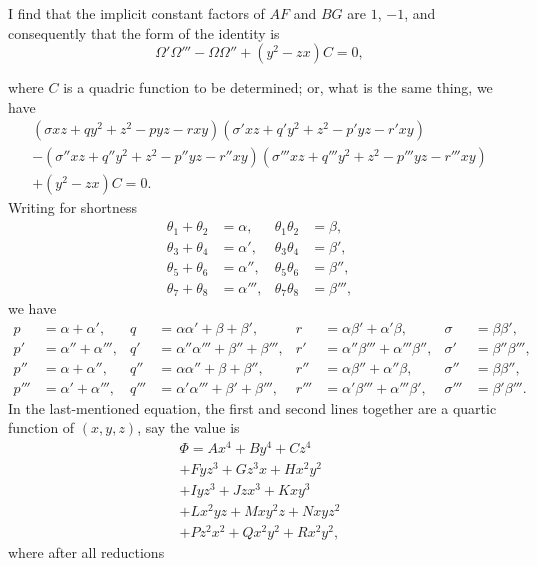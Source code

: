 \documentclass[11pt,a4paper]{book}
\begin{document}
{{{I find that the implicit constant factors of $AF$ and $BG$ are $1$, $-1$, and consequently
that the form of the identity is
\[
\Omega'\Omega''' - \Omega\Omega'' + (y^2 - zx)C = 0,
\]

\newpage
\noindent where $C$ is a quadric function to be determined; or, what is the same thing, we have
\begin{multline*}
(\sigma xz + qy^2 + z^2 - pyz - rxy)
(\sigma' xz + q'y^2 + z^2 - p'yz - r'xy) \\
- (\sigma'' xz + q''y^2 + z^2 - p''yz - r''xy)
(\sigma''' xz + q'''y^2 + z^2 - p'''yz - r'''xy) \\
+ (y^2 - zx)C = 0.
\end{multline*}
Writing for shortness
\begin{align*}
\theta_1 + \theta_2 &= \alpha,     & \theta_1\theta_2 &= \beta, \\
\theta_3 + \theta_4 &= \alpha',    & \theta_3\theta_4 &= \beta', \\
\theta_5 + \theta_6 &= \alpha'',   & \theta_5\theta_6 &= \beta'', \\
\theta_7 + \theta_8 &= \alpha''',  & \theta_7\theta_8 &= \beta''',
\end{align*}
we have
\begin{align*}
p  &= \alpha + \alpha', & q  &= \alpha\alpha' + \beta + \beta', & r  &= \alpha\beta' + \alpha'\beta, & \sigma &= \beta\beta', \\
p' &= \alpha'' + \alpha''', & q' &= \alpha''\alpha''' + \beta'' + \beta''', & r' &= \alpha''\beta''' + \alpha'''\beta'', & \sigma' &= \beta''\beta''', \\
p'' &= \alpha + \alpha'', & q'' &= \alpha\alpha'' + \beta + \beta'', & r'' &= \alpha\beta'' + \alpha''\beta, & \sigma'' &= \beta\beta'', \\
p''' &= \alpha' + \alpha''', & q''' &= \alpha'\alpha''' + \beta' + \beta''', & r''' &= \alpha'\beta''' + \alpha'''\beta', & \sigma''' &= \beta'\beta'''.
\end{align*}
In the last-mentioned equation, the first and second lines together are a quartic
function of $(x, y, z)$, say the value is
\begin{multline*}
\Phi = Ax^4 + By^4 + Cz^4 \\
+ Fyz^3 + Gz^3x + Hx^2y^2 \\
+ Iyz^3 + Jzx^3 + Kxy^3 \\
+ Lx^2yz + Mxy^2z + Nxyz^2 \\
+ Pz^2x^2 + Qx^2y^2 + Rx^2y^2,
\end{multline*}
where after all reductions
}}}
\end{document}
